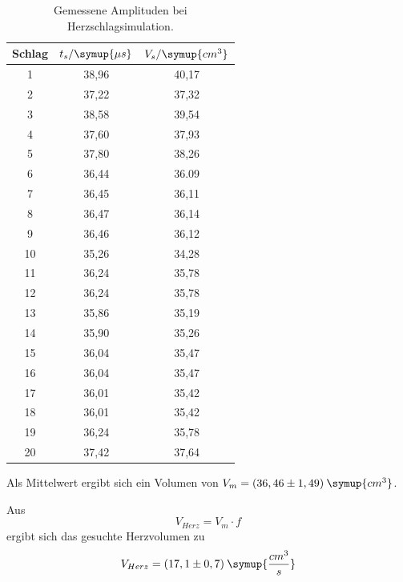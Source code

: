 \begin{table}[H]
  \centering
  \caption{Gemessene Amplituden bei Herzschlagsimulation.}
  \label{tab:spannung1}
  \begin{tabular}{c c c }
    \toprule
  Schlag & $t_s/\symup{\mu s}$ & $V_s/\symup{cm^3}$ \\
    \midrule
    1  &  38,96 & 40,17     \\
    2  &  37,22 & 37,32     \\
    3  &  38,58 & 39,54     \\
    4  &  37,60 & 37,93     \\
    5  &  37,80 & 38,26     \\
    6  &  36,44 & 36.09     \\
    7  &  36,45 & 36,11     \\
    8  &  36,47 & 36,14     \\
    9  &  36,46 & 36,12     \\
    10 &  35,26 & 34,28      \\
    11 &  36,24 & 35,78     \\
    12  &  36,24 & 35,78     \\
    13  &  35,86 & 35,19     \\
    14  &  35,90 & 35,26     \\
    15  &  36,04 & 35,47     \\
    16  &  36,04 & 35,47     \\
    17  &  36,01 & 35,42     \\
    18  &  36,01 & 35,42     \\
    19  &  36,24 & 35,78     \\
    20  &  37,42 & 37,64     \\
    \bottomrule
  \end{tabular}
\end{table}

Als Mittelwert ergibt sich ein Volumen von $V_{m} = (36,46 \pm 1,49) \: \symup{cm^3}$.

Aus
\begin{equation*}
  V_{Herz} = V_m \cdot f
\end{equation*}
ergibt sich das gesuchte Herzvolumen zu
\begin{equation*}
  V_{Herz} = (17,1 \pm 0,7) \: \symup{\frac{cm^3}{s}}
\end{equation*}
